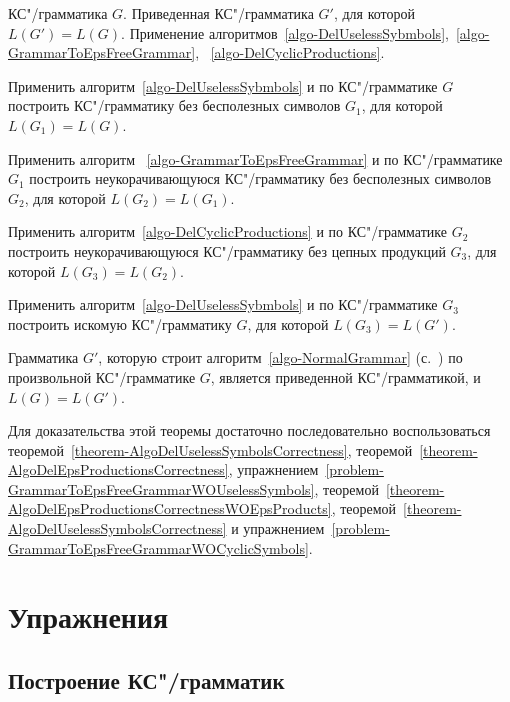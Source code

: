 {\label{algo-NormalGrammar}КС"/грамматика $G$.}
{Приведенная КС"/грамматика $G'$, для которой $L(G')=L(G)$.}
{Применение алгоритмов~\ref{algo-DelUselessSybmbols},~\ref{algo-GrammarToEpsFreeGrammar}, ~\ref{algo-DelCyclicProductions}.}
{
\item Применить алгоритм~\ref{algo-DelUselessSybmbols} и по КС"/грамматике $G$ построить КС"/грамматику без бесполезных символов $G_1$, для которой $L(G_1)=L(G)$.

\item Применить алгоритм ~\ref{algo-GrammarToEpsFreeGrammar} и по КС"/грамматике $G_1$ построить неукорачивающуюся КС"/грамматику без бесполезных символов $G_2$, для которой $L(G_2)=L(G_1)$.

\item Применить алгоритм~\ref{algo-DelCyclicProductions} и по КС"/грамматике $G_2$ построить неукорачивающуюся КС"/грамматику без цепных продукций $G_3$, для которой $L(G_3)=L(G_2)$.

\item Применить алгоритм~\ref{algo-DelUselessSybmbols} и по КС"/грамматике $G_3$ построить искомую КС"/грамматику $G$, для которой $L(G_3)=L(G')$.
}

\begin{mytheorem}
\label{theorem-NormalGrammarAlgoCorrectness}
Грамматика $G'$, которую строит алгоритм~\ref{algo-NormalGrammar} (с.~\pageref{algo-NormalGrammar}) по произвольной КС"/грамматике $G$, является приведенной КС"/грамматикой, и $L(G)=L(G')$.
\end{mytheorem}

\begin{myproof}
Для доказательства этой теоремы достаточно последовательно воспользоваться теоремой~\ref{theorem-AlgoDelUselessSymbolsCorrectness}, теоремой~\ref{theorem-AlgoDelEpsProductionsCorrectness}, упражнением~\ref{problem-GrammarToEpsFreeGrammarWOUselessSymbols}, теоремой~\ref{theorem-AlgoDelEpsProductionsCorrectnessWOEpsProducts}, теоремой~\ref{theorem-AlgoDelUselessSymbolsCorrectness} и упражнением~\ref{problem-GrammarToEpsFreeGrammarWOCyclicSymbols}.
\end{myproof}

\section{Упражнения}
\label{Chapter6Exs}
\subsection*{Построение КС"/грамматик}


